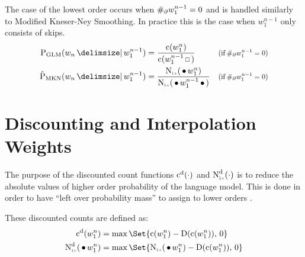 The case of the lowest order occurs when $\NumSkpOp{w_1^{n-1}} = 0$ and is
handled similarly to Modified Kneser-Ney Smoothing.
In practice this is the case when $w_1^{n-1}$ only consists of skips.
\begin{subequations}
  \label{eq:glm-lowest}
  \begin{align}
    \ProbGLM {w_n}{w_1^{n-1}} &= \frac{\Count(w_1^n)}{\Count(w_1^{n-1} \Skp)}
      & \Condition{\NumSkpOp{w_1^{n-1}} = 0} \\
    \ProbMKN*{w_n}{w_1^{n-1}} &= \frac{\ContCountIp(\WSkp w_1^n)}{\ContCountIp(\WSkp w_1^{n-1} \WSkp)}
      & \Condition{\NumSkpOp{w_1^{n-1}} = 0}
  \end{align}
\end{subequations}

\section{Discounting and Interpolation Weights}
\label{sec:discounts-interpolation-weights}

The purpose of the discounted count functions $\DiscountedCount(\DummyArg)$
and $\DiscountedCount*(\DummyArg)$ is to reduce the absolute values of
higher order probability of the language model.
This is done in order to have \enquote{left over probability mass} to assign
to lower orders \parencite{NeyEssen1991,NeyKneser1994}.

These discounted counts are defined as:
\begin{subequations}
  \begin{align}
    \DiscountedCount(w_1^n)        &= \max \Set{\Count(w_1^n) - \Discount(\Count(w_1^n)), \, 0} \\
    \DiscountedCount*(\WSkp w_1^n) &= \max \Set{ \ContCountIp(\WSkp w_1^n) - \Discount(\Count(w_1^n)), \, 0 }
  \end{align}
\end{subequations}

